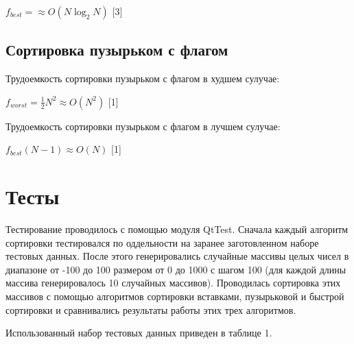 \documentclass[a4paper,14pt]{report}
\begin{document}
$f_{best} = \approx O(N \log_2N)$ [3]


\subsection*{Сортировка пузырьком с флагом}

Трудоемкость сортировки пузырьком с флагом в худшем сулучае:

$f_{worst} = \frac{1}{2}N^2 \approx O(N^2)$ [1]

Трудоемкость сортировки пузырьком с флагом в лучшем сулучае:

$f_{best} (N - 1) \approx O(N)$ [1]



\section*{Тесты}

Тестирование проводилось с помощью модуля QtTest. Сначала каждый алгоритм сортировки тестировался по оддельности на заранее заготовленном наборе тестовых данных.
После этого генерировались случайные массивы целых чисел в диапазоне от -100 до 100 размером от 0 до 1000 с шагом 100 (для каждой длины массива генерировалось 10 случайных массивов). Проводилась сортировка этих массивов с помощью алгоритмов сортировки вставками, пузырьковой и быстрой сортировки и сравнивались результаты работы этих трех алгоритмов.

Использованный набор тестовых данных приведен в таблице 1.
\end{document}
